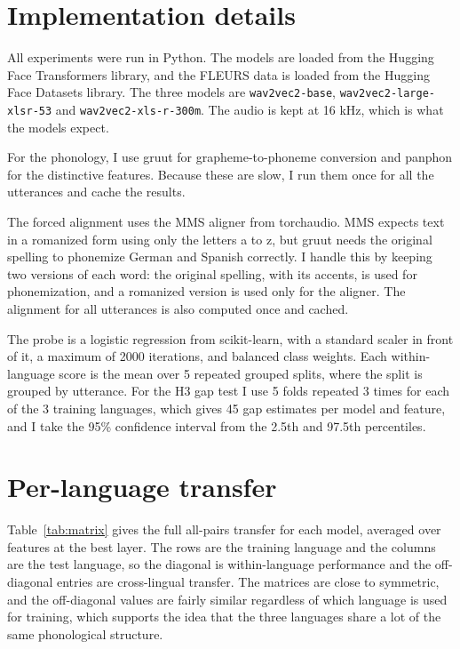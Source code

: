 \documentclass[twoside,11pt]{article}
\begin{document}
\appendix
\section{Implementation details}

All experiments were run in Python. The models are loaded from the Hugging Face
Transformers library, and the FLEURS data is loaded from the Hugging Face Datasets
library. The three models are \texttt{wav2vec2-base}, \texttt{wav2vec2-large-xlsr-53}
and \texttt{wav2vec2-xls-r-300m}. The audio is kept at 16 kHz, which is what the
models expect.

For the phonology, I use gruut for grapheme-to-phoneme conversion and panphon for
the distinctive features. Because these are slow, I run them once for all the
utterances and cache the results.

The forced alignment uses the MMS aligner from torchaudio. MMS expects text in a
romanized form using only the letters a to z, but gruut needs the original spelling
to phonemize German and Spanish correctly. I handle this by keeping two versions of
each word: the original spelling, with its accents, is used for phonemization, and a
romanized version is used only for the aligner. The alignment for all utterances is
also computed once and cached.

The probe is a logistic regression from scikit-learn, with a standard scaler in
front of it, a maximum of 2000 iterations, and balanced class weights. Each
within-language score is the mean over 5 repeated grouped splits, where the split is
grouped by utterance. For the H3 gap test I use 5 folds repeated 3 times for each of
the 3 training languages, which gives 45 gap estimates per model and feature, and I
take the 95\% confidence interval from the 2.5th and 97.5th percentiles.

\section{Per-language transfer}

Table~\ref{tab:matrix} gives the full all-pairs transfer for each model, averaged
over features at the best layer. The rows are the training language and the columns
are the test language, so the diagonal is within-language performance and the
off-diagonal entries are cross-lingual transfer. The matrices are close to
symmetric, and the off-diagonal values are fairly similar regardless of which
language is used for training, which supports the idea that the three languages
share a lot of the same phonological structure.
\end{document}
